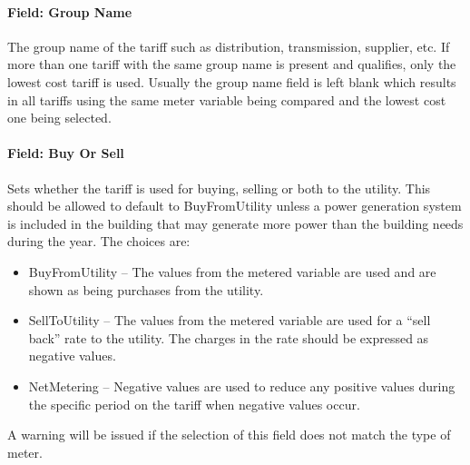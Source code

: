 \paragraph{Field: Group Name}\label{field-group-name}

The group name of the tariff such as distribution, transmission, supplier, etc. If more than one tariff with the same group name is present and qualifies, only the lowest cost tariff is used. Usually the group name field is left blank which results in all tariffs using the same meter variable being compared and the lowest cost one being selected.

\paragraph{Field: Buy Or Sell}\label{field-buy-or-sell}

Sets whether the tariff is used for buying, selling or both to the utility. This should be allowed to default to BuyFromUtility unless a power generation system is included in the building that may generate more power than the building needs during the year. The choices are:

\begin{itemize}
\item
  BuyFromUtility -- The values from the metered variable are used and are shown as being purchases from the utility.
\item
  SellToUtility -- The values from the metered variable are used for a ``sell back'' rate to the utility. The charges in the rate should be expressed as negative values.
\item
  NetMetering -- Negative values are used to reduce any positive values during the specific period on the tariff when negative values occur.
\end{itemize}

A warning will be issued if the selection of this field does not match the type of meter.
